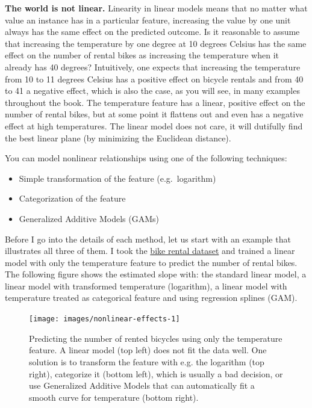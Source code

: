 \documentclass[
  12pt,
]{krantz}
\providecommand{\tightlist}{%
  \setlength{\itemsep}{0pt}\setlength{\parskip}{0pt}}
\begin{document}
\textbf{The world is not linear.}
Linearity in linear models means that no matter what value an instance has in a particular feature, increasing the value by one unit always has the same effect on the predicted outcome.
Is it reasonable to assume that increasing the temperature by one degree at 10 degrees Celsius has the same effect on the number of rental bikes as increasing the temperature when it already has 40 degrees?
Intuitively, one expects that increasing the temperature from 10 to 11 degrees Celsius has a positive effect on bicycle rentals and from 40 to 41 a negative effect, which is also the case, as you will see, in many examples throughout the book.
The temperature feature has a linear, positive effect on the number of rental bikes, but at some point it flattens out and even has a negative effect at high temperatures.
The linear model does not care, it will dutifully find the best linear plane (by minimizing the Euclidean distance).

You can model nonlinear relationships using one of the following techniques:

\begin{itemize}
\tightlist
\item
  Simple transformation of the feature (e.g.~logarithm)
\item
  Categorization of the feature
\item
  Generalized Additive Models (GAMs)
\end{itemize}

Before I go into the details of each method, let us start with an example that illustrates all three of them.
I took the \protect\hyperlink{bike-data}{bike rental dataset} and trained a linear model with only the temperature feature to predict the number of rental bikes.
The following figure shows the estimated slope with: the standard linear model, a linear model with transformed temperature (logarithm), a linear model with temperature treated as categorical feature and using regression splines (GAM).

\begin{figure}

{\centering \texttt{[image: images/nonlinear-effects-1]} 

}

\caption{Predicting the number of rented bicycles using only the temperature feature. A linear model (top left) does not fit the data well. One solution is to transform the feature with e.g. the logarithm (top right), categorize it (bottom left), which is usually a bad decision, or use Generalized Additive Models that can automatically fit a smooth curve for temperature (bottom right).}\label{fig:nonlinear-effects}
\end{figure}
\end{document}
